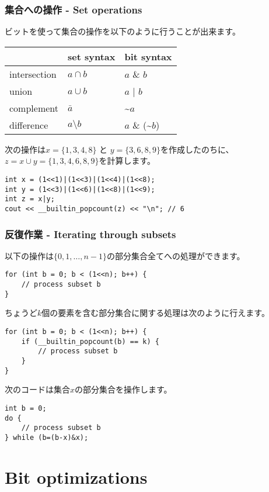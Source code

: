 \subsubsection{集合への操作 - Set operations}

ビットを使って集合の操作を以下のように行うことが出来ます。

\begin{center}
\begin{tabular}{lll}
& set syntax & bit syntax \\
\hline
intersection & $a \cap b$ & $a$ \& $b$ \\
union & $a \cup b$ & $a$ | $b$ \\
complement & $\bar a$ & \textasciitilde$a$ \\
difference & $a \setminus b$ & $a$ \& (\textasciitilde$b$) \\
\end{tabular}
\end{center}

次の操作は$x=\{1,3,4,8\}$ と $y=\{3,6,8,9\}$を作成したのちに、
$z = x \cup y = \{1,3,4,6,8,9\}$を計算します。

\begin{lstlisting}
int x = (1<<1)|(1<<3)|(1<<4)|(1<<8);
int y = (1<<3)|(1<<6)|(1<<8)|(1<<9);
int z = x|y;
cout << __builtin_popcount(z) << "\n"; // 6
\end{lstlisting}

\subsubsection{反復作業 - Iterating through subsets}

以下の操作は$\{0,1,\ldots,n-1\}$の部分集合全てへの処理ができます。

\begin{lstlisting}
for (int b = 0; b < (1<<n); b++) {
    // process subset b
}
\end{lstlisting}
ちょうど$k$個の要素を含む部分集合に関する処理は次のように行えます。
\begin{lstlisting}
for (int b = 0; b < (1<<n); b++) {
    if (__builtin_popcount(b) == k) {
        // process subset b
    }
}
\end{lstlisting}
次のコードは集合$x$の部分集合を操作します。
\begin{lstlisting}
int b = 0;
do {
    // process subset b
} while (b=(b-x)&x);
\end{lstlisting}

\section{Bit optimizations}

